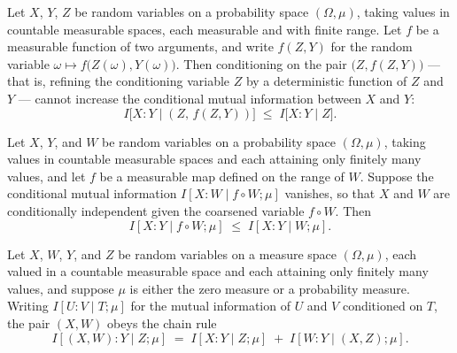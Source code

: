\begin{theorem}
\label{ProbabilityTheory.condMutualInfo_conditioning_prod_right_function_le}
\leanok
{}
Let $X$, $Y$, $Z$ be random variables on a probability space $(\Omega, \mu)$, taking
values in countable measurable spaces, each measurable and with finite range. Let $f$ be
a measurable function of two arguments, and write $f(Z, Y)$ for the random variable
$\omega \mapsto f\bigl(Z(\omega), Y(\omega)\bigr)$. Then conditioning on the pair
$\bigl(Z, f(Z, Y)\bigr)$ — that is, refining the conditioning variable $Z$ by a
deterministic function of $Z$ and $Y$ — cannot increase the conditional mutual
information between $X$ and $Y$:
\[
  I\bigl[X : Y \mid (Z,\, f(Z, Y))\bigr] \;\le\; I\bigl[X : Y \mid Z\bigr].
\]
\end{theorem}

\begin{theorem}
\label{ProbabilityTheory.condMutualInfo_comp_conditioning_le_of_condMutualInfo_eq_zero}
\leanok
{}
Let $X$, $Y$, and $W$ be random variables on a probability space $(\Omega,\mu)$, taking
values in countable measurable spaces and each attaining only finitely many values, and
let $f$ be a measurable map defined on the range of $W$. Suppose the conditional mutual
information $I[X : W \mid f\circ W;\mu]$ vanishes, so that $X$ and $W$ are conditionally
independent given the coarsened variable $f\circ W$. Then
\[
  I[X : Y \mid f\circ W;\mu] \;\le\; I[X : Y \mid W;\mu].
\]
\end{theorem}

\begin{theorem}
\label{ProbabilityTheory.condMutualInfo_prod_left_eq_add}
\leanok
{}
Let $X$, $W$, $Y$, and $Z$ be random variables on a measure space $(\Omega,\mu)$, each
valued in a countable measurable space and each attaining only finitely many values, and
suppose $\mu$ is either the zero measure or a probability measure. Writing $I[U : V \mid
T;\mu]$ for the mutual information of $U$ and $V$ conditioned on $T$, the pair $(X,W)$
obeys the chain rule
\[
  I[(X,W) : Y \mid Z;\mu]
  \;=\; I[X : Y \mid Z;\mu] \;+\; I[W : Y \mid (X,Z);\mu].
\]
\end{theorem}

